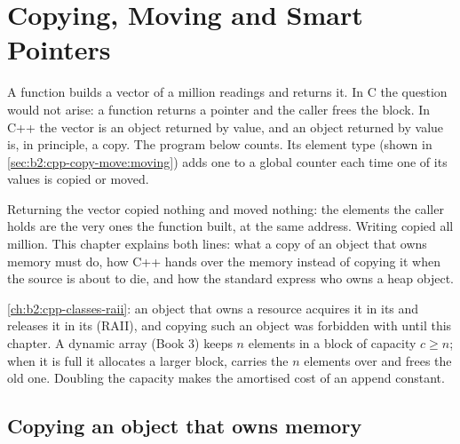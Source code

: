 \chapter{Copying, Moving and Smart Pointers}\label{ch:b2:cpp-copy-move}

A function builds a vector of a million readings and returns it. In C the question would not arise: a function
returns a pointer and the caller frees the block. In C++ the vector is an object returned by value, and an object
returned by value is, in principle, a copy. The program below counts. Its element type  (shown in
\cref{sec:b2:cpp-copy-move:moving}) adds one to a global counter each time one of its values is copied or moved.

\label{lst:b2:cpp-copy-move:hook}

\label{out:b2:cpp-copy-move:hook}

Returning the vector copied nothing and moved nothing: the elements the caller holds are the very ones the
function built, at the same address. Writing  copied all million. This chapter explains both
lines: what a copy of an object that owns memory must do, how C++ hands over the memory instead of copying it when
the source is about to die, and how the standard  express who owns a heap object.

\begin{recall}
\cref{ch:b2:cpp-classes-raii}: an object that owns a resource acquires it in its  and releases it in its
 (RAII), and copying such an object was forbidden with  until this chapter. A dynamic array
(Book 3) keeps $n$ elements in a block of capacity $c \geq n$; when it is full it allocates a larger block, carries
the $n$ elements over and frees the old one. Doubling the capacity makes the amortised cost of an append constant.
\end{recall}

\section{Copying an object that owns memory}\label{sec:b2:cpp-copy-move:copying}

